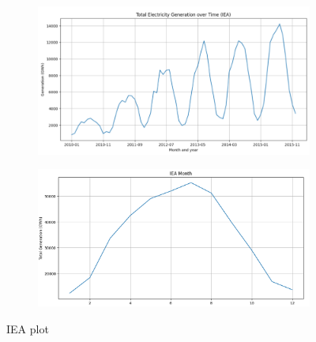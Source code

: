 \documentclass[12pt]{article}
\begin{document}
\newpage
\begin{figure}[h]
    \centering
    \begin{subfigure}{0.48\textwidth}
      \centering
      \includegraphics[width=\linewidth]{IEA Graph.png}
    \end{subfigure}
    \hfill
    \begin{subfigure}{0.48\textwidth}
      \centering
      \includegraphics[width=\linewidth]{IEA Graph2.png}
    \end{subfigure}
    \caption{IEA plot}
    \label{fig:combined3}
  \end{figure}
\end{document}
